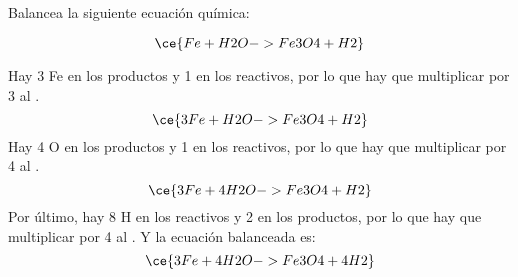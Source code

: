 Balancea la siguiente ecuación química:

\[
    \ce{Fe + H2O -> Fe3O4 + H2}
\]

\begin{solutionbox}{5cm}
    Hay 3 Fe en los productos y 1 en los reactivos, por lo que hay que multiplicar por 3 al .
    \[
        \ce{3Fe + H2O -> Fe3O4 + H2}
    \]
    Hay 4 O en los productos y 1 en los reactivos, por lo que hay que multiplicar por 4 al .
    \[
        \ce{3Fe + 4H2O -> Fe3O4 + H2}
    \]
    Por último, hay 8 H en los reactivos y 2 en los productos, por lo que hay que multiplicar por 4 al . Y la ecuación balanceada es:
    \[
        \ce{3Fe + 4H2O -> Fe3O4 + 4H2}
    \]
\end{solutionbox}